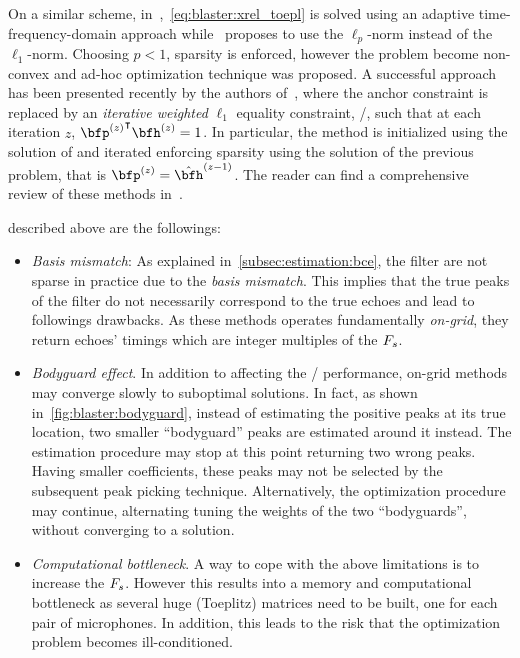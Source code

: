 \mynewline
On a similar scheme, in~,~\cref{eq:blaster:xrel_toepl} is solved using an adaptive time-frequency-domain approach while~ proposes to use the $\ell_p$-norm instead of the $\ell_1$-norm.
Choosing $p < 1$, sparsity is enforced, however the problem become non-convex and ad-hoc optimization technique was proposed.
A successful approach has been presented recently by the authors of~, where the anchor constraint is replaced by an \textit{iterative weighted} $\ell_1$ equality constraint, \ie/, such that at each iteration $z$, $\ktranspose{\bfp^{(z)}}\bfh^{(z)} = 1$.
In particular, the method is initialized using the solution of  and iterated enforcing sparsity using the solution of the previous problem, that is $\bfp^{(z)} = \hat{\bfh}^{(z-1)}$.
The reader can find a comprehensive review of these methods in~.

 described above are the followings:
\begin{itemize}
    \item \textit{Basis mismatch}:
    As explained in~\cref{subsec:estimation:bce}, the filter are not sparse in practice due to the \textit{basis mismatch}.
    This implies that the true peaks of the filter do not necessarily correspond to the true echoes and lead to followings drawbacks.
    As these methods operates fundamentally \textit{on-grid}, they return echoes' timings which are integer multiples of the $F_s$.
    \item \textit{Bodyguard effect}.
    In addition to affecting the \AER/ performance, on-grid methods may converge slowly to suboptimal solutions.
    In fact, as shown in~\cref{fig:blaster:bodyguard}, instead of estimating the positive peaks at its true location, two smaller ``bodyguard'' peaks are estimated around it instead.
    The estimation procedure may stop at this point returning two wrong peaks.
    Having smaller coefficients, these peaks may not be selected by the subsequent peak picking technique.
    Alternatively, the optimization procedure may continue, alternating tuning the weights of the two ``bodyguards'', without converging to a solution.
    \item \textit{Computational bottleneck}.
    A way to cope with the above limitations is to increase the $F_s$.
    However this results into a memory and computational bottleneck as several huge (Toeplitz) matrices need to be built, one for each pair of microphones.
    In addition, this leads to the risk that the optimization problem becomes ill-conditioned.
\end{itemize}

